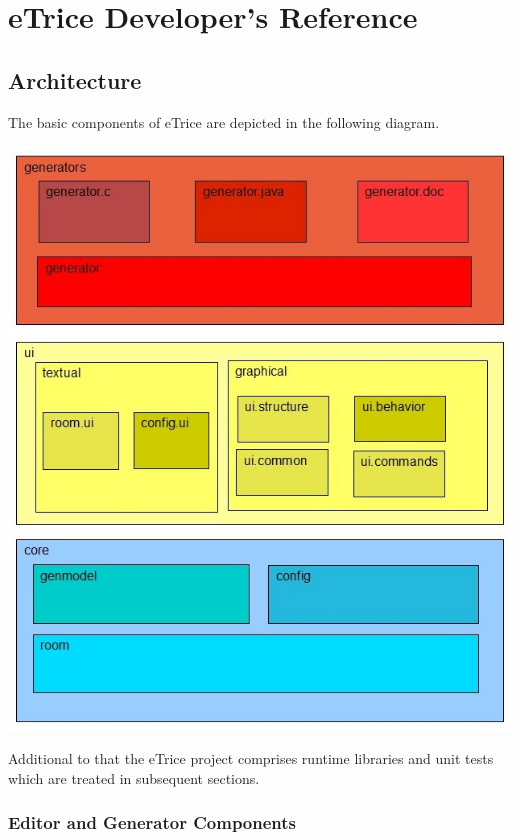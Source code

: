 \chapter{eTrice Developer's Reference}

\section{Architecture}

The basic components of eTrice are depicted in the following diagram.

\includegraphics[scale=0.5]{images/200-components.jpg}

Additional to that the eTrice project comprises runtime libraries and unit tests which are treated in 
subsequent sections.

\subsection{Editor and Generator Components}

